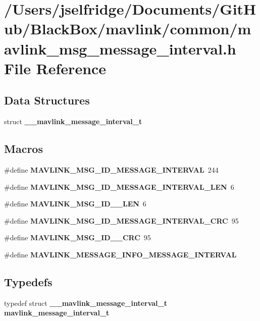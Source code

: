 \section{/\+Users/jselfridge/\+Documents/\+Git\+Hub/\+Black\+Box/mavlink/common/mavlink\+\_\+msg\+\_\+message\+\_\+interval.h File Reference}
\label{mavlink__msg__message__interval_8h}
\subsection*{Data Structures}
\begin{DoxyCompactItemize}
\item 
struct \textbf{ \+\_\+\+\_\+mavlink\+\_\+message\+\_\+interval\+\_\+t}
\end{DoxyCompactItemize}
\subsection*{Macros}
\begin{DoxyCompactItemize}
\item 
\#define \textbf{ M\+A\+V\+L\+I\+N\+K\+\_\+\+M\+S\+G\+\_\+\+I\+D\+\_\+\+M\+E\+S\+S\+A\+G\+E\+\_\+\+I\+N\+T\+E\+R\+V\+AL}~244
\item 
\#define \textbf{ M\+A\+V\+L\+I\+N\+K\+\_\+\+M\+S\+G\+\_\+\+I\+D\+\_\+\+M\+E\+S\+S\+A\+G\+E\+\_\+\+I\+N\+T\+E\+R\+V\+A\+L\+\_\+\+L\+EN}~6
\item 
\#define \textbf{ M\+A\+V\+L\+I\+N\+K\+\_\+\+M\+S\+G\+\_\+\+I\+D\+\_\+\_\+\+L\+EN}~6
\item 
\#define \textbf{ M\+A\+V\+L\+I\+N\+K\+\_\+\+M\+S\+G\+\_\+\+I\+D\+\_\+\+M\+E\+S\+S\+A\+G\+E\+\_\+\+I\+N\+T\+E\+R\+V\+A\+L\+\_\+\+C\+RC}~95
\item 
\#define \textbf{ M\+A\+V\+L\+I\+N\+K\+\_\+\+M\+S\+G\+\_\+\+I\+D\+\_\+\_\+\+C\+RC}~95
\item 
\#define \textbf{ M\+A\+V\+L\+I\+N\+K\+\_\+\+M\+E\+S\+S\+A\+G\+E\+\_\+\+I\+N\+F\+O\+\_\+\+M\+E\+S\+S\+A\+G\+E\+\_\+\+I\+N\+T\+E\+R\+V\+AL}
\end{DoxyCompactItemize}
\subsection*{Typedefs}
\begin{DoxyCompactItemize}
\item 
typedef struct \textbf{ \+\_\+\+\_\+mavlink\+\_\+message\+\_\+interval\+\_\+t} \textbf{ mavlink\+\_\+message\+\_\+interval\+\_\+t}
\end{DoxyCompactItemize}


